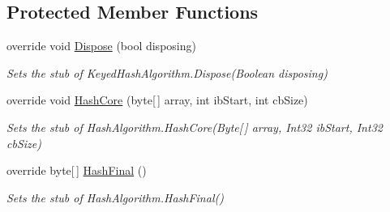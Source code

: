 \subsection*{Protected Member Functions}
\begin{DoxyCompactItemize}
\item 
override void \hyperlink{class_system_1_1_security_1_1_cryptography_1_1_fakes_1_1_stub_keyed_hash_algorithm_a0db5c1a08aee33f777e58b731809d337}{Dispose} (bool disposing)
\begin{DoxyCompactList}\small\item\em Sets the stub of Keyed\-Hash\-Algorithm.\-Dispose(\-Boolean disposing)\end{DoxyCompactList}\item 
override void \hyperlink{class_system_1_1_security_1_1_cryptography_1_1_fakes_1_1_stub_keyed_hash_algorithm_ac7a1a7a62245a055a3a922c6569eb0f0}{Hash\-Core} (byte\mbox{[}$\,$\mbox{]} array, int ib\-Start, int cb\-Size)
\begin{DoxyCompactList}\small\item\em Sets the stub of Hash\-Algorithm.\-Hash\-Core(\-Byte\mbox{[}$\,$\mbox{]} array, Int32 ib\-Start, Int32 cb\-Size)\end{DoxyCompactList}\item 
override byte\mbox{[}$\,$\mbox{]} \hyperlink{class_system_1_1_security_1_1_cryptography_1_1_fakes_1_1_stub_keyed_hash_algorithm_a49c273cde2c1b014fa94fcb647d5c2f8}{Hash\-Final} ()
\begin{DoxyCompactList}\small\item\em Sets the stub of Hash\-Algorithm.\-Hash\-Final()\end{DoxyCompactList}\end{DoxyCompactItemize}
